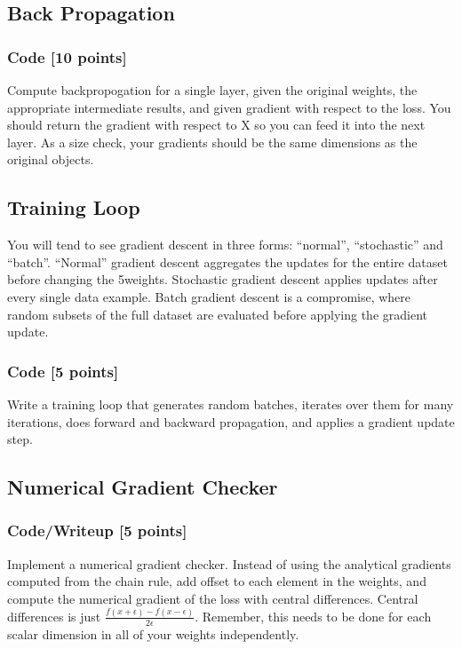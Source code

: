 \documentclass[a4 paper]{article}
\numberwithin{equation}{section}
\newcommand{\0}{\mathbf{0}}
\begin{document}
    \subsection{Back Propagation}
        \subsubsection{Code [10 points]} Compute backpropogation for a single layer, given the original weights, the appropriate intermediate results, and given gradient with respect to the loss. You should return the gradient with respect to X so you can feed it into the next layer. As a size check, your gradients should be the same dimensions as the original objects.

    \subsection{Training Loop}
        You will tend to see gradient descent in three forms: “normal”, “stochastic” and “batch”. “Normal” gradient descent aggregates the updates for the entire dataset before changing the 5weights. Stochastic gradient descent applies updates after every single data example. Batch gradient descent is a compromise, where random subsets of the full dataset are evaluated before applying the gradient update.
        
        \subsubsection{Code [5 points]} Write a training loop that generates random batches, iterates over them for many iterations, does forward and backward propagation, and applies a gradient update step.
        
    \subsection{Numerical Gradient Checker}
        \subsubsection{Code/Writeup [5 points]} Implement a numerical gradient checker. Instead of using the analytical gradients computed from the chain rule, add offset to each element in the weights, and compute the numerical gradient of the loss with central differences. Central differences is just $\frac{f(x+\epsilon)-f(x-\epsilon)}{2\epsilon}$. Remember, this needs to be done for each scalar dimension in all of your weights independently.
\end{document}
